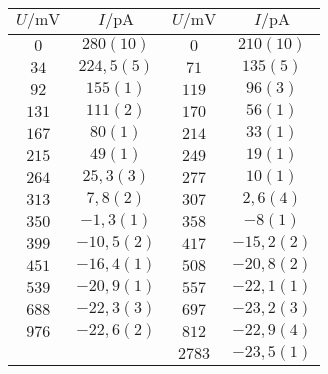 \begin{figure}[htbp]
{\begin{tabular}{cc||cc}
\hline
$U / \unit{\milli\volt}$ & $I / \unit{\pico\ampere}$ & $U / \unit{\milli\volt}$ & $I / \unit{\pico\ampere}$ \\ 
\hline
$0$ & $280(10)$ & $0$ & $210(10)$ \\
$34$ & $224,5(5)$ & $71$ & $135(5)$ \\
$92$ & $155(1)$ & $119$ & $96(3)$ \\
$131$ & $111(2)$ & $170$ & $56(1)$ \\
$167$ & $80(1)$ & $214$ & $33(1)$ \\
$215$ & $49(1)$ & $249$ & $19(1)$ \\
$264$ & $25,3(3)$ & $277$ & $10(1)$ \\
$313$ & $7,8(2)$ & $307$ & $2,6(4)$ \\
$350$ & $-1,3(1)$ & $358$ & $-8(1)$ \\
$399$ & $-10,5(2)$ & $417$ & $-15,2(2)$ \\
$451$ & $-16,4(1)$ & $508$ & $-20,8(2)$ \\
$539$ & $-20,9(1)$ & $557$ & $-22,1(1)$ \\
$688$ & $-22,3(3)$ & $697$ & $-23,2(3)$ \\
$976$ & $-22,6(2)$ & $812$ & $-22,9(4)$ \\
   &    & $2783$ & $-23,5(1)$ \\
\hline\end{tabular}
\label{kennlinie_546nm}
}\end{figure}